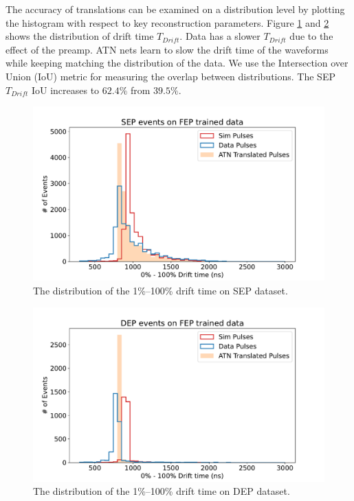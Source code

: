  The accuracy of translations can be examined on a distribution level by plotting the histogram with respect to key reconstruction parameters. Figure \ref{fig:drift_times_sep} and \ref{fig:drift_times_dep} shows the distribution of drift time $T_{Drift}$. Data has a slower $T_{Drift}$ due to the effect of the preamp. ATN nets learn to slow the drift time of the waveforms while keeping matching the distribution of the data. We use the Intersection over Union (IoU) metric for measuring the overlap between distributions. The SEP $T_{Drift}$ IoU increases to $62.4\%$ from $39.5\%$.
 
\begin{figure}[htb!]
\centering
\includegraphics[width=0.99\linewidth,trim={0pc 0pc 0pc 0pc},clip]{ch8/figs/sep_drift_time.pdf}
\caption{The distribution of the 1\%–100\% drift time on SEP dataset.}
\label{fig:drift_times_sep}
\end{figure}

\begin{figure}[htb!]
\centering
\includegraphics[width=0.95\linewidth,trim={0pc 0pc 0pc 0pc},clip]{ch8/figs/dep_drift_time.pdf}
\caption{The distribution of the 1\%–100\% drift time on DEP dataset.}
\label{fig:drift_times_dep}
\end{figure}

